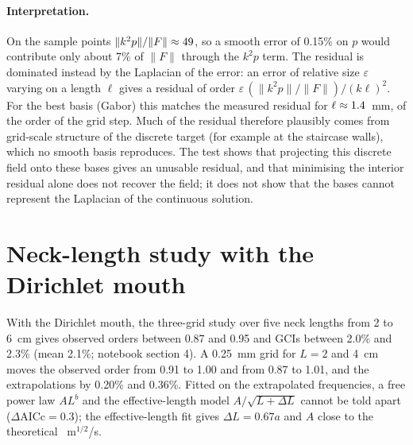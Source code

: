 \documentclass[11pt,a4paper]{article}
\begin{document}
\begin{appendices}
\paragraph{Interpretation.} On the sample points $\lVert k^2 p\rVert/\lVert F\rVert \approx
49$, so a smooth error of 0.15\% on $p$ would contribute only about 7\% of $\lVert F
\rVert$ through the $k^2p$ term. The residual is dominated instead by the Laplacian of the
error: an error of relative size $\varepsilon$ varying on a length $\ell$ gives a residual of
order $\varepsilon\,(\lVert k^2p\rVert/\lVert F\rVert)/(k\ell)^2$. For the best basis (Gabor)
this matches the measured residual for $\ell \approx 1.4$~mm, of the order of the grid
step. Much of the residual therefore plausibly comes from grid-scale structure of the
discrete target (for example at the staircase walls), which no smooth basis reproduces. The test shows that projecting this
discrete field onto these bases gives an unusable residual, and that minimising the interior
residual alone does not recover the field; it does not show that the bases cannot represent
the Laplacian of the continuous solution.


\section{Neck-length study with the Dirichlet mouth}
\label{app:neck}

With the Dirichlet mouth, the three-grid study over five neck lengths from 2 to 6~cm gives
observed orders between 0.87 and 0.95 and GCIs between 2.0\% and 2.3\% (mean 2.1\%;
notebook section 4). A 0.25~mm grid for $L=2$ and 4~cm moves the observed order from 0.91 to
1.00 and from 0.87 to 1.01, and the extrapolations by 0.20\% and 0.36\%. Fitted on the
extrapolated frequencies, a free power law $AL^b$ and the effective-length model
$A/\sqrt{L+\Delta L}$ cannot be told apart ($\Delta\mathrm{AICc}=0.3$); the effective-length
fit gives $\Delta L = 0.67a$ and $A$ close to the theoretical \aTheory~m$^{1/2}$/s.

\end{appendices}
\end{document}
